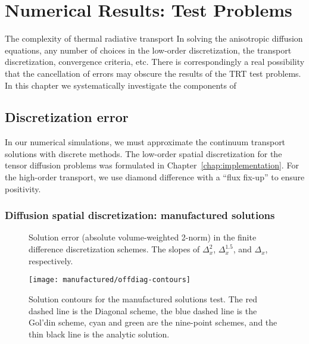 
\chapter{Numerical Results: Test Problems}\label{chap:simpleNumericalResults}

The complexity of thermal radiative transport 
In solving the anisotropic diffusion equations, any number of choices in the
low-order discretization, the transport discretization, convergence criteria,
etc. There is correspondingly a real possibility that the cancellation of
errors may obscure the results of the TRT test problems. In this chapter we
systematically investigate the components of 

\section{Discretization error}

In our numerical simulations, we must approximate the continuum transport
solutions with discrete methods. The low-order spatial discretization for the
tensor diffusion problems was formulated in Chapter~\ref{chap:implementation}.
For the high-order transport, we use diamond difference \cite{Lew1984} with a
``flux fix-up'' to ensure positivity.

\subsection{Diffusion spatial discretization: manufactured solutions}

\begin{figure}[htb]
  \centering\small
  
  \caption[Solution error (absolute volume-weighted 2-norm) in the
  finite difference discretization schemes.]{Solution error (absolute
  volume-weighted 2-norm) in the finite difference discretization schemes. The
  slopes of $\Delta_x^{2}$, $\Delta_x^{1.5}$, and
  $\Delta_x$, respectively.}
  \label{fig:manuConvergence}
\end{figure}

\begin{figure}[htb]
  \centering
  \texttt{[image: manufactured/offdiag-contours]}
  \caption[Solution contours for the manufactured solutions test.]{
  Solution contours for the manufactured solutions test. The red dashed line is
  the Diagonal scheme, the blue dashed line is the Gol'din scheme, cyan and green
  are the nine-point schemes, and the thin black line is the analytic solution.}
  \label{fig:manuSolution}
\end{figure}

